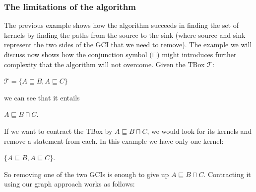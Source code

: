 \documentclass{sfuthesis}
\theoremstyle{plain}
\theoremstyle{definition}
\begin{document}
\subsubsection{The limitations of the algorithm}
The previous example shows how the algorithm succeeds in finding the set of kernels by finding the paths from the source to the sink (where source and sink represent the two sides of the GCI that we need to remove). The example we will discuss now shows how the conjunction symbol ($\sqcap$) might introduces further complexity that the algorithm will not overcome. Given the TBox $\mathcal{T}$:
\begin{center}
$\mathcal{T} = \lbrace A \sqsubseteq B, A \sqsubseteq C \rbrace$
\end{center}
we can see that it entails
\begin{center}
$A \sqsubseteq B \sqcap C$.
\end{center}
If we want to contract the TBox by $A \sqsubseteq B \sqcap C$, we would look for its kernels and remove a statement from each. In this example we have only one kernel:
\begin{center}
$\lbrace A \sqsubseteq B, A \sqsubseteq C \rbrace$.
\end{center}
So removing one of the two GCIs is enough to give up $A \sqsubseteq B \sqcap C$. Contracting it using our graph approach works as follows:
\end{document}
